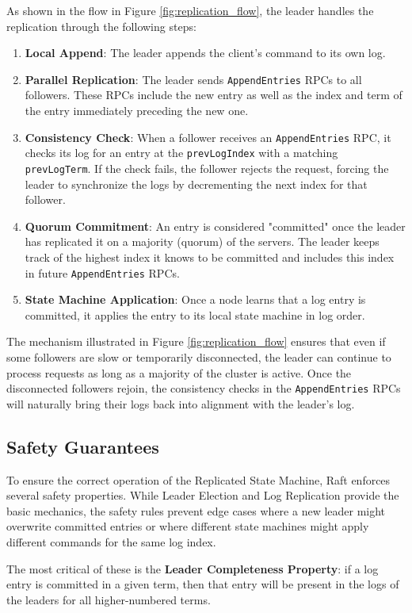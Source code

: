 As shown in the flow in Figure \ref{fig:replication_flow}, the leader handles the replication through the following steps:
\begin{enumerate}
    \item \textbf{Local Append}: The leader appends the client's command to its own log.
    \item \textbf{Parallel Replication}: The leader sends \texttt{AppendEntries} RPCs to all followers. These RPCs include the new entry as well as the index and term of the entry immediately preceding the new one.
    \item \textbf{Consistency Check}: When a follower receives an \texttt{AppendEntries} RPC, it checks its log for an entry at the \texttt{prevLogIndex} with a matching \texttt{prevLogTerm}. If the check fails, the follower rejects the request, forcing the leader to synchronize the logs by decrementing the next index for that follower.
    \item \textbf{Quorum Commitment}: An entry is considered "committed" once the leader has replicated it on a majority (quorum) of the servers. The leader keeps track of the highest index it knows to be committed and includes this index in future \texttt{AppendEntries} RPCs.
    \item \textbf{State Machine Application}: Once a node learns that a log entry is committed, it applies the entry to its local state machine in log order. 
\end{enumerate}

The mechanism illustrated in Figure \ref{fig:replication_flow} ensures that even if some followers are slow or temporarily disconnected, the leader can continue to process requests as long as a majority of the cluster is active. Once the disconnected followers rejoin, the consistency checks in the \texttt{AppendEntries} RPCs will naturally bring their logs back into alignment with the leader's log.

\subsection{Safety Guarantees}
To ensure the correct operation of the Replicated State Machine, Raft enforces several safety properties. While Leader Election and Log Replication provide the basic mechanics, the safety rules prevent edge cases where a new leader might overwrite committed entries or where different state machines might apply different commands for the same log index.

The most critical of these is the \textbf{Leader Completeness Property}: if a log entry is committed in a given term, then that entry will be present in the logs of the leaders for all higher-numbered terms.

